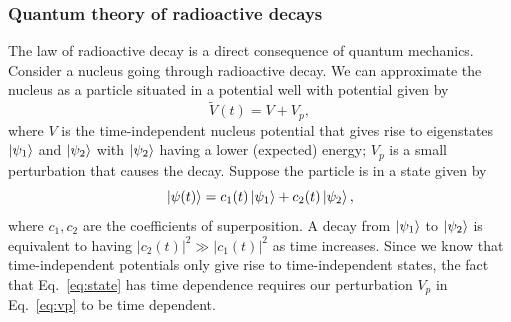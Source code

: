 \documentclass[nofootinbib,preprint,aps]{revtex4-1}
\begin{document}
        \subsubsection{Quantum theory of radioactive decays}
        The law of radioactive decay is a direct consequence of quantum mechanics.
        Consider a nucleus going through radioactive decay.
        We can approximate the nucleus as a particle situated in a potential well with potential given by
        \begin{equation}
            \label{eq:vp}
            \tilde{V}(t) = V + V_p,
        \end{equation}
        where $V$ is the time-independent nucleus potential that gives rise to eigenstates $\ket{\psi_1}$
        and $\ket{\psi_2}$ with $\ket{\psi_2}$ having a lower (expected) energy; $V_p$ is a small
        perturbation that causes the decay.
        Suppose the particle is in a state given by
        \begin{equation}
            \label{eq:state}
            \ket{\psi(t)} = c_1(t)\ket{\psi_1} + c_2(t)\ket{\psi_2},
        \end{equation}
        where $c_1,c_2$ are the coefficients of superposition.
        A decay from $\ket{\psi_1}$ to $\ket{\psi_2}$ is equivalent to
        having $|c_2(t)|^2\gg |c_1(t)|^2$ as time increases. Since we know that time-independent potentials
        only give rise to time-independent states, the fact that Eq.~\ref{eq:state} has time dependence requires
        our perturbation $V_p$ in Eq.~\ref{eq:vp} to be time dependent.
        
\end{document}
